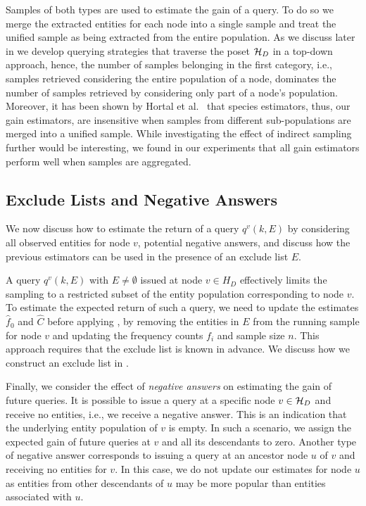 Samples of both types are used to estimate the gain of a query. To do so we merge the extracted entities for each node into a single sample and treat the unified sample as being extracted from the entire population. As we discuss later in  we develop querying strategies that traverse the poset $\mathcal{H}_D$ in a top-down approach, hence, the number of samples belonging in the first category, i.e., samples retrieved considering the entire population of a node, dominates the number of samples retrieved by considering only part of a node's population. Moreover, it has been shown by Hortal et al.~\cite{hortal2006evaluating} that species estimators, thus, our gain estimators, are insensitive when samples from different sub-populations are merged into a unified sample. While investigating the effect of indirect sampling further would be interesting, we found in our experiments that all gain estimators perform well when samples are aggregated.

\subsection{Exclude Lists and Negative Answers}
\label{sec:excludelist}
We now discuss how to estimate the return of a query $q^v(k,E)$ by considering all observed entities for node $v$, potential negative answers, and discuss how the previous estimators can be used in the presence of an exclude list $E$.

A query $q^v(k, E)$ with $E \ne \emptyset$ issued at node $v \in H_D$ effectively limits the sampling to a restricted subset of the entity population corresponding to node $v$. To estimate the expected return of such a query, we need to update the estimates $\hat{f}_0$ and $\hat{C}$ before applying , by removing the entities in $E$ from the running sample for node $v$ and updating the frequency counts $f_i$ and sample size $n$. This approach requires that the exclude list is known in advance. We discuss how we construct an exclude list in .

Finally, we consider the effect of {\em negative answers} on estimating the gain of future queries. It is possible to issue a query at a specific node $v \in \mathcal{H}_D$ and receive no entities, i.e., we receive a negative answer. This is an indication that the underlying entity population of $v$ is empty. In such a scenario, we assign the expected gain of future queries at $v$ and all its descendants to zero. Another type of negative answer corresponds to issuing a query at an ancestor node $u$ of $v$ and receiving no entities for $v$. In this case, we do not update our estimates for node $u$ as entities from other descendants of $u$ may be more popular than entities associated with $u$.

